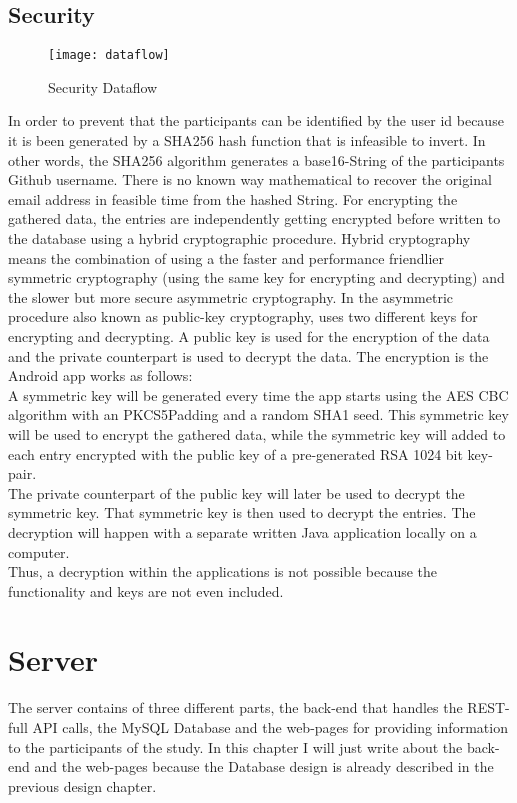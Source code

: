 \subsection{Security}
\begin{figure}
\texttt{[image: dataflow]}
\caption{Security Dataflow}\label{security}
 	\vspace{10 mm}
\end{figure}

In order to prevent that the participants can be identified by the user id because it is been generated by a SHA256 hash function that is infeasible to invert. In other words, the SHA256 algorithm generates a base16-String of the participants Github username. There is no known way mathematical to recover the original email address in feasible time from the hashed String. 
\bigbreak
For encrypting the gathered data, the entries are independently getting encrypted before written to the database using a hybrid cryptographic procedure. Hybrid cryptography means the combination of using a the faster and performance friendlier symmetric cryptography (using the same key for encrypting and decrypting) and the slower but more secure asymmetric cryptography. In the asymmetric procedure also known as public-key cryptography, uses two different keys for encrypting and decrypting. A public key is used for the encryption of the data and the private counterpart is used to decrypt the data.
\bigbreak
The encryption is the Android app works as follows:\\
A symmetric key will be generated every time the app starts using the AES CBC algorithm with an PKCS5Padding and a random SHA1 seed. This symmetric key will be used to encrypt the gathered data, while the symmetric key will added to each entry encrypted with the public key of a pre-generated RSA 1024 bit key-pair.\\ 
The private counterpart of the public key will later be used to decrypt the symmetric key. That symmetric key is then used to decrypt the entries. 
The decryption will happen with a separate written Java application locally on a computer.\\
Thus, a decryption within the applications is not possible because the functionality and keys are not even included. 

\section{Server}
The server contains of three different parts, the back-end that handles the REST-full API calls, the MySQL Database and the web-pages for providing information to the participants of the study. 
In this chapter I will just write about the back-end and the web-pages because the Database design is already described in the previous design chapter. 

